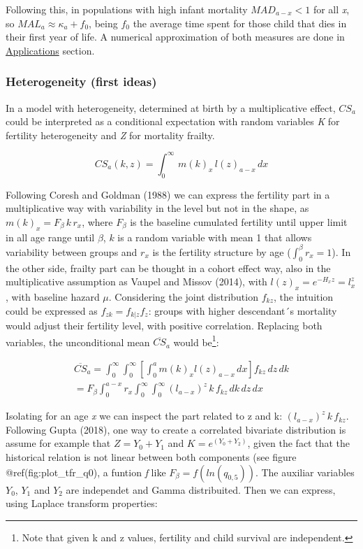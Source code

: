 \documentclass[
]{article}
\begin{document}
Following this, in populations with high infant mortality
\(MAD_{a-x}<1\) for all \emph{x}, so \(MAL_a\approx\kappa_a+f_0\), being
\(f_0\) the average time spent for those child that dies in their first
year of life. A numerical approximation of both measures are done in
\protect\hyperlink{Applications}{Applications} section.

\hypertarget{heterogeneity-first-ideas}{%
\subsubsection{Heterogeneity (first
ideas)}\label{heterogeneity-first-ideas}}

In a model with heterogeneity, determined at birth by a multiplicative
effect, \(CS_a\) could be interpreted as a conditional expectation with
random variables \emph{K} for fertility heterogeneity and \emph{Z} for
mortality frailty.

\[CS_a(k,z) = \int_{0}^{\infty}\,{m(k)}_x\,{l(z)}_{a-x}\,dx\]

Following Coresh and Goldman (1988) we can express the fertility part in
a multiplicative way with variability in the level but not in the shape,
as \({m(k)}_x = F_\beta\,k\,r_x\), where \(F_\beta\) is the baseline
cumulated fertility until upper limit in all age range until \(\beta\),
\(k\) is a random variable with mean 1 that allows variability between
groups and \(r_x\) is the fertility structure by age
(\(\int_{0}^{\beta}{r_x}=1\)). In the other side, frailty part can be
thought in a cohort effect way, also in the multiplicative assumption as
Vaupel and Missov (2014), with \(l(z)_x=e^{-H_{x}z}=l_x^z\), with
baseline hazard \(\mu\). Considering the joint distribution \(f_{kz}\),
the intuition could be expressed as \(f_{zk}=f_{k|z}f_z\): groups with
higher descendant´s mortality would adjust their fertility level, with
positive correlation. Replacing both variables, the unconditional mean
\(\overline{CS}_a\) would be\footnote{Note that given k and z values,
  fertility and child survival are independent.}:

\[
\begin{aligned}
\overline{CS}_a = \int_{0}^{\infty}\int_{0}^{\infty}\left[\int_{0}^{a}{ {m(k)}_x l(z)_{a-x}\,dx}\right]f_{kz}\,dz \,dk\\
= F_\beta \int_{0}^{a-x} r_x \int_{0}^{\infty} \int_{0}^{\infty} {(l_{a-x})^z} \, k\, f_{kz} \,dk\,dz\,dx
\end{aligned}
\]

Isolating for an age \emph{x} we can inspect the part related to z and
k: \((l_{a-x})^z \, k\, f_{kz}\). Following Gupta (2018), one way to
create a correlated bivariate distribution is assume for example that
\(Z = Y_0 + Y_1\) and \(K = e^{(Y_0 + Y_2)}\), given the fact that the
historical relation is not linear between both components (see figure
@ref(fig:plot\_tfr\_q0), a funtion \emph{f} like
\(F_\beta=f(ln(q_{0,5}))\). The auxiliar variables \(Y_0\), \(Y_1\) and
\(Y_2\) are independet and Gamma distribuited. Then we can express,
using Laplace transform properties:
\end{document}
